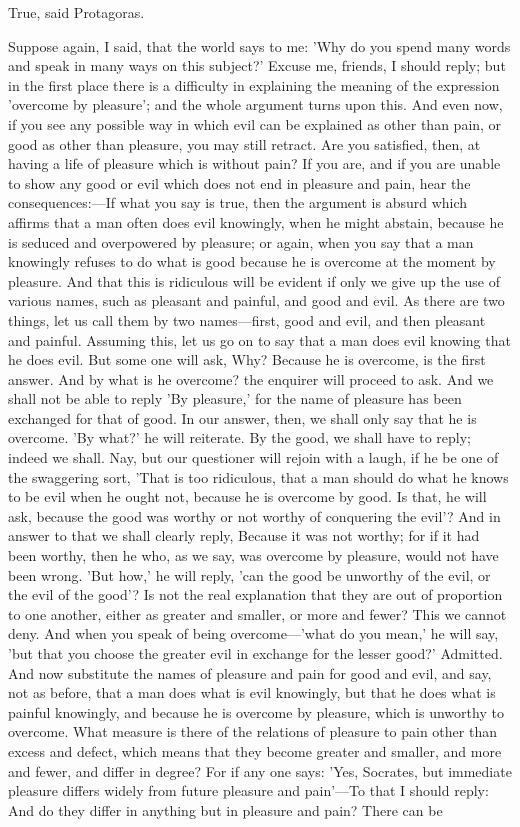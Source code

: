 \documentclass[11pt,letter]{article}
\begin{document}
\par  True, said Protagoras.

\par  Suppose again, I said, that the world says to me: 'Why do you spend many words and speak in many ways on this subject?' Excuse me, friends, I should reply; but in the first place there is a difficulty in explaining the meaning of the expression 'overcome by pleasure'; and the whole argument turns upon this. And even now, if you see any possible way in which evil can be explained as other than pain, or good as other than pleasure, you may still retract. Are you satisfied, then, at having a life of pleasure which is without pain? If you are, and if you are unable to show any good or evil which does not end in pleasure and pain, hear the consequences:—If what you say is true, then the argument is absurd which affirms that a man often does evil knowingly, when he might abstain, because he is seduced and overpowered by pleasure; or again, when you say that a man knowingly refuses to do what is good because he is overcome at the moment by pleasure. And that this is ridiculous will be evident if only we give up the use of various names, such as pleasant and painful, and good and evil. As there are two things, let us call them by two names—first, good and evil, and then pleasant and painful. Assuming this, let us go on to say that a man does evil knowing that he does evil. But some one will ask, Why? Because he is overcome, is the first answer. And by what is he overcome? the enquirer will proceed to ask. And we shall not be able to reply 'By pleasure,' for the name of pleasure has been exchanged for that of good. In our answer, then, we shall only say that he is overcome. 'By what?' he will reiterate. By the good, we shall have to reply; indeed we shall. Nay, but our questioner will rejoin with a laugh, if he be one of the swaggering sort, 'That is too ridiculous, that a man should do what he knows to be evil when he ought not, because he is overcome by good. Is that, he will ask, because the good was worthy or not worthy of conquering the evil'? And in answer to that we shall clearly reply, Because it was not worthy; for if it had been worthy, then he who, as we say, was overcome by pleasure, would not have been wrong. 'But how,' he will reply, 'can the good be unworthy of the evil, or the evil of the good'? Is not the real explanation that they are out of proportion to one another, either as greater and smaller, or more and fewer? This we cannot deny. And when you speak of being overcome—'what do you mean,' he will say, 'but that you choose the greater evil in exchange for the lesser good?' Admitted. And now substitute the names of pleasure and pain for good and evil, and say, not as before, that a man does what is evil knowingly, but that he does what is painful knowingly, and because he is overcome by pleasure, which is unworthy to overcome. What measure is there of the relations of pleasure to pain other than excess and defect, which means that they become greater and smaller, and more and fewer, and differ in degree? For if any one says: 'Yes, Socrates, but immediate pleasure differs widely from future pleasure and pain'—To that I should reply: And do they differ in anything but in pleasure and pain? There can be 
\end{document}
